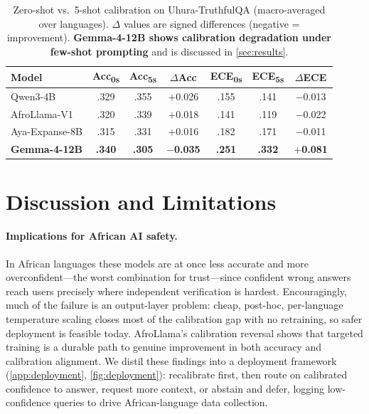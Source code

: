 \documentclass[11pt,a4paper]{article}
\begin{document}
\begin{table}[ht]
\centering
\caption{%
  Zero-shot vs.\ 5-shot calibration on Uhura-TruthfulQA (macro-averaged over
  languages). $\Delta$ values are signed differences (negative = improvement).
  \textbf{Gemma-4-12B shows calibration degradation under few-shot prompting}
  and is discussed in \cref{sec:results}.
}
\label{tab:fewshot}
\small
\begin{tabular}{lccc ccc}
\toprule
\textbf{Model}
  & \textbf{Acc\textsubscript{0s}} & \textbf{Acc\textsubscript{5s}} & $\Delta$\textbf{Acc}
  & \textbf{ECE\textsubscript{0s}} & \textbf{ECE\textsubscript{5s}} & $\Delta$\textbf{ECE} \\
\midrule
Qwen3-4B         & .329 & .355 & $+$0.026 & .155 & .141 & $-$0.013 \\
AfroLlama-V1     & .320 & .339 & $+$0.018 & .141 & .119 & $-$0.022 \\
Aya-Expanse-8B   & .315 & .331 & $+$0.016 & .182 & .171 & $-$0.011 \\
\textbf{Gemma-4-12B} & \textbf{.340} & \textbf{.305} & $\mathbf{-}$\textbf{0.035}
                     & \textbf{.251} & \textbf{.332} & $\mathbf{+}$\textbf{0.081} \\
\bottomrule
\end{tabular}
\end{table}

\section{Discussion and Limitations}
\label{sec:discussion}

\paragraph{Implications for African AI safety.}
In African languages these models are at once less accurate and more
overconfident---the worst combination for trust---since confident wrong answers
reach users precisely where independent verification is hardest. Encouragingly,
much of the failure is an output-layer problem: cheap, post-hoc, per-language
temperature scaling closes most of the calibration gap with no retraining, so
safer deployment is feasible today. AfroLlama's calibration reversal shows that
targeted training is a durable path to genuine improvement in both accuracy and
calibration alignment. We distil these findings into a deployment framework
(\cref{app:deployment}, \cref{fig:deployment}): recalibrate first, then route on
calibrated confidence to answer, request more context, or abstain and defer,
logging low-confidence queries to drive African-language data collection.
\end{document}
